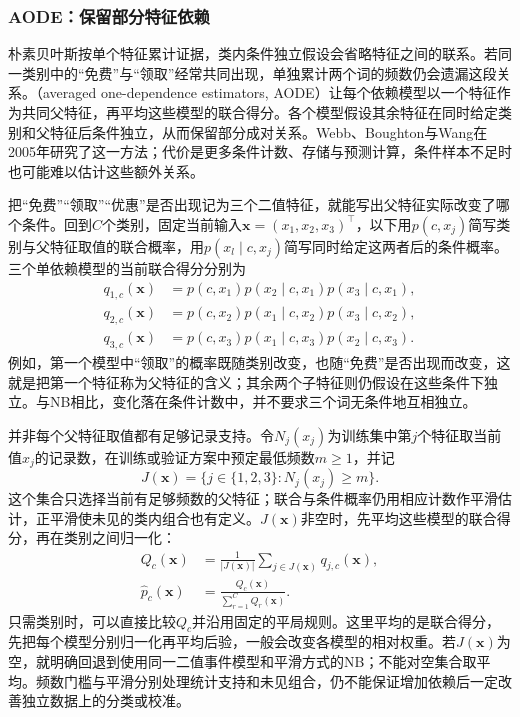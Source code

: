 \subsubsection{AODE：保留部分特征依赖}

\label{sec:classification-naive-bayes-dependence-extension}

朴素贝叶斯按单个特征累计证据，类内条件独立假设会省略特征之间的联系。若同一类别中的“免费”与“领取”经常共同出现，单独累计两个词的频数仍会遗漏这段关系。（averaged one-dependence estimators, AODE）让每个依赖模型以一个特征作为共同父特征，再平均这些模型的联合得分。各个模型假设其余特征在同时给定类别和父特征后条件独立，从而保留部分成对关系。Webb、Boughton与Wang在2005年研究了这一方法；代价是更多条件计数、存储与预测计算，条件样本不足时也可能难以估计这些额外关系。

把“免费”“领取”“优惠”是否出现记为三个二值特征，就能写出父特征实际改变了哪个条件。回到$C$个类别，固定当前输入$\bm x=(x_1,x_2,x_3)^\top$，以下用$p(c,x_j)$简写类别与父特征取值的联合概率，用$p(x_l\mid c,x_j)$简写同时给定这两者后的条件概率。三个单依赖模型的当前联合得分分别为
\[
  \begin{aligned}
    q_{1,c}(\bm x)
      &=p(c,x_1)p(x_2\mid c,x_1)p(x_3\mid c,x_1),\\
    q_{2,c}(\bm x)
      &=p(c,x_2)p(x_1\mid c,x_2)p(x_3\mid c,x_2),\\
    q_{3,c}(\bm x)
      &=p(c,x_3)p(x_1\mid c,x_3)p(x_2\mid c,x_3).
  \end{aligned}
\]
例如，第一个模型中“领取”的概率既随类别改变，也随“免费”是否出现而改变，这就是把第一个特征称为父特征的含义；其余两个子特征则仍假设在这些条件下独立。与NB相比，变化落在条件计数中，并不要求三个词无条件地互相独立。

并非每个父特征取值都有足够记录支持。令$N_j(x_j)$为训练集中第$j$个特征取当前值$x_j$的记录数，在训练或验证方案中预定最低频数$m\geq1$，并记
\[
  J(\bm x)=\{j\in\{1,2,3\}:N_j(x_j)\geq m\}.
\]
这个集合只选择当前有足够频数的父特征；联合与条件概率仍用相应计数作平滑估计，正平滑使未见的类内组合也有定义。$J(\bm x)$非空时，先平均这些模型的联合得分，再在类别之间归一化：
\begin{equation}
  \label{eq:classification-aode-joint-average}
  \begin{aligned}
    Q_c(\bm x)
      &=\frac{1}{|J(\bm x)|}
          \sum_{j\in J(\bm x)}q_{j,c}(\bm x),\\
    \hat p_c(\bm x)
      &=\frac{Q_c(\bm x)}{\sum_{r=1}^{C}Q_r(\bm x)}.
  \end{aligned}
\end{equation}
只需类别时，可以直接比较$Q_c$并沿用固定的平局规则。这里平均的是联合得分，先把每个模型分别归一化再平均后验，一般会改变各模型的相对权重。若$J(\bm x)$为空，就明确回退到使用同一二值事件模型和平滑方式的NB；不能对空集合取平均。频数门槛与平滑分别处理统计支持和未见组合，仍不能保证增加依赖后一定改善独立数据上的分类或校准。

